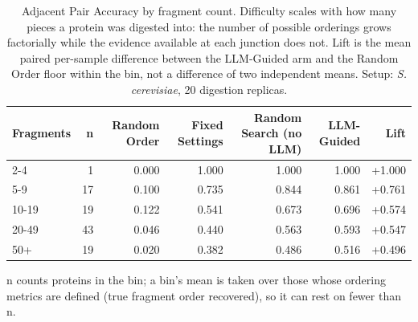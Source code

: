 \begin{table}[!tb]
  \centering
  \caption{Adjacent Pair Accuracy by fragment count. Difficulty scales with how many pieces a protein was digested into: the number of possible orderings grows factorially while the evidence available at each junction does not. Lift is the mean paired per-sample difference between the LLM-Guided arm and the Random Order floor within the bin, not a difference of two independent means. Setup: \textnormal{\textnormal{\textit{S. cerevisiae}}}, 20 digestion replicas.}
  \label{tab:stratification_yeast_r20}
  \begin{tabular}{lrrrrrr}
    \toprule
    Fragments & n & Random Order & Fixed Settings & Random Search (no LLM) & LLM-Guided & Lift \\
    \midrule
    2-4 & 1 & 0.000 & 1.000 & 1.000 & 1.000 & +1.000 \\
    5-9 & 17 & 0.100 & 0.735 & 0.844 & 0.861 & +0.761 \\
    10-19 & 19 & 0.122 & 0.541 & 0.673 & 0.696 & +0.574 \\
    20-49 & 43 & 0.046 & 0.440 & 0.563 & 0.593 & +0.547 \\
    50+ & 19 & 0.020 & 0.382 & 0.486 & 0.516 & +0.496 \\
    \bottomrule
  \end{tabular}
  \par\smallskip\footnotesize{n counts proteins in the bin; a bin's mean is taken over those whose ordering metrics are defined (true fragment order recovered), so it can rest on fewer than n.}
\end{table}

